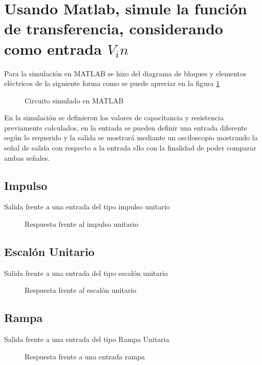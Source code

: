 \documentclass[conference]{IEEEtran}
\begin{document}
	\section{Usando Matlab, simule la función de transferencia, considerando como entrada $V_in$}
	
	Para la simulación en MATLAB se hizo del diagrama de bloques y elementos eléctricos de la siguiente forma como se puede apreciar en la figura \ref{fig:circuito-matlab}
	
	\begin{figure}[h]
		\centering
		\caption{Circuito simulado en MATLAB}
		\label{fig:circuito-matlab}
	\end{figure}
	
	En la simulación se definieron los valores de capacitancia y resistencia previamente calculados, en la entrada se pueden definir una entrada diferente según lo requerido y la salida se mostrará mediante un osciloscopio mostrando la señal de salida con respecto a la entrada ello con la finalidad de poder comparar ambas señales.
	
	\subsection{Impulso}
	Salida frente a una entrada del tipo impulso unitario
	\begin{figure}[h]
		\centering
		\caption{Respuesta frente al impulso unitario}
		\label{fig:impulso}
	\end{figure}
		

	\subsection{Escalón Unitario}
	Salida frente a una entrada del tipo escalón unitario
	\begin{figure}[h]
		\centering
		\caption{Respuesta frente al escalón unitario}
		\label{fig:escalonunitario}
	\end{figure}
	
	\subsection{Rampa}
	Salida frente a una entrada del tipo Rampa Unitaria
	\begin{figure}[h]
		\centering
		\caption{Respuesta frente a una entrada rampa}
		\label{fig:rampa}
	\end{figure}
	
\end{document}
